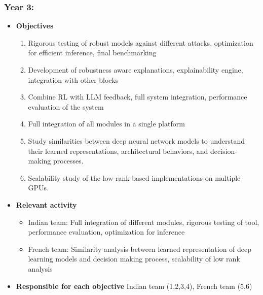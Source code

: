 \documentclass[a4paper,11pt]{article}
\begin{document}
\subsubsection*{Year 3:}
\begin{itemize}
	\item \textbf{Objectives}
	\begin{enumerate}
		\item Rigorous testing of robust models against different attacks, optimization for efficient inference, final benchmarking
		\item Development of robustness aware explanations, explainability engine, integration with other blocks
		\item Combine RL with LLM feedback, full system integration, performance evaluation of the system
		\item Full integration of all modules in a single platform
		\item Study similarities between deep neural network models to understand their learned representations, architectural behaviors, and decision-making processes.
		\item Scalability study of the low-rank based implementations on multiple GPUs.
	\end{enumerate}
	\item \textbf{Relevant activity}
	\begin{itemize}
		\item Indian team: Full integration of different modules, rigorous testing of tool, performance evaluation, optimization for inference
		\item French team: Similarity analysis between learned representation of deep learning models and decision making process, scalability of low rank analysis
	\end{itemize}
	\item \textbf{Responsible for each objective} Indian team (1,2,3,4), French team (5,6)
\end{itemize}
\end{document}
